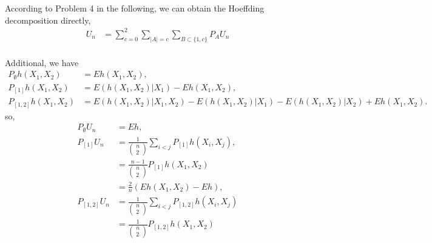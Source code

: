 \begin{solution}
    According to Problem 4 in the following, we can obtain the Hoeffding decomposition directly,
    \begin{equation*}
        \begin{split}
            U_{n} & = \sum_{c=0}^{2} \sum_{|A|=c}  \sum_{B\subset \{1,c\}}  P_{A} U_{n} \\
        \end{split}
    \end{equation*}

    Additional, we have     
    \begin{equation*}
        \begin{split}
            P_{\emptyset} h(X_1, X_2) & =E h(X_1, X_2) ,\\ 
            P_{[1]} h(X_1, X_2)& = E\left(h(X_1,X_2) | X_1\right)-E h(X_1, X_2) ,\\ 
            P_{[1, 2]} h(X_1, X_2)& =E\left(h(X_1, X_2) | X_1, X_2\right)-E\left(h(X_1, X_2) | X_1\right)-E\left(h(X_1, X_2) | X_2\right)+E h(X_1, X_2).
        \end{split}
    \end{equation*}
    so, 
    \begin{equation*}
        \begin{split}
            P_{\emptyset} U_n & =E h ,\\ 
            P_{[1]} U_n& = \frac{1}{ \begin{pmatrix} n \\ 2 \end{pmatrix} } \sum_{i<j} P_{[1]} h(X_i,X_j) ,\\ 
                & = \frac{n-1}{ \begin{pmatrix} n \\ 2 \end{pmatrix} }  P_{[1]} h(X_1, X_2) \\
                & = \frac{2}{n}  ( Eh(X_1, X_2) - Eh ), \\
            P_{[1, 2]} U_n & = \frac{1}{ \begin{pmatrix} n \\ 2 \end{pmatrix} } \sum_{i<j} P_{[1,2]} h(X_i,X_j) \\ 
                & = \frac{1}{ \begin{pmatrix} n \\ 2 \end{pmatrix} } P_{[1,2]} h(X_1,X_2) \\
        \end{split}
    \end{equation*}
    

\end{solution}
